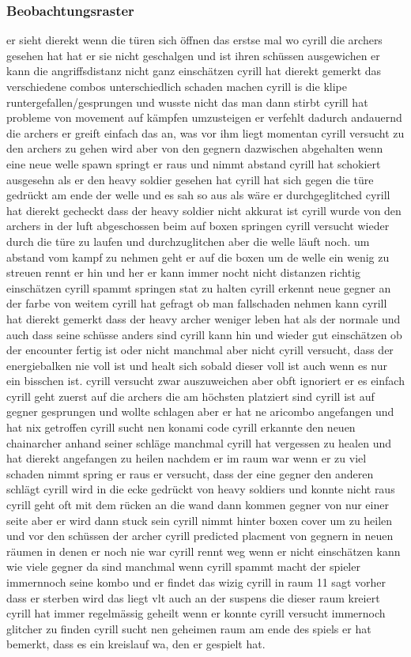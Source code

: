 \documentclass[../Main.tex]{subfiles}
\begin{document}
\subsubsection{Beobachtungsraster}
er sieht dierekt wenn die türen sich öffnen
das erstse mal wo cyrill die archers gesehen hat hat er sie nicht geschalgen und ist ihren schüssen ausgewichen
er kann die angriffsdistanz nicht ganz einschätzen
cyrill hat dierekt gemerkt das verschiedene combos unterschiedlich schaden machen
cyrill is die klipe runtergefallen/gesprungen und wusste nicht das man dann stirbt
cyrill hat probleme von movement auf kämpfen umzusteigen er verfehlt dadurch andauernd die archers
er greift einfach das an, was vor ihm liegt momentan
cyrill versucht zu den archers zu gehen wird aber von den gegnern dazwischen abgehalten
wenn eine neue welle spawn springt er raus und nimmt abstand
cyrill hat schokiert ausgesehn als er den heavy soldier gesehen hat
cyrill hat sich gegen die türe gedrückt am ende der welle und es sah so aus als wäre er durchgeglitched
cyrill hat dierekt gecheckt dass der heavy soldier nicht akkurat ist
cyrill wurde von den archers in der luft abgeschossen beim auf boxen springen
cyrill versucht wieder durch die türe zu laufen und durchzuglitchen aber die welle läuft noch.
um abstand vom kampf zu nehmen geht er auf die boxen
um de welle ein wenig zu streuen rennt er hin und her
er kann immer nocht nicht distanzen richtig einschätzen
cyrill spammt springen stat zu halten
cyrill erkennt neue gegner an der farbe von weitem
cyrill hat gefragt ob man fallschaden nehmen kann
cyrill hat dierekt gemerkt dass der heavy archer weniger leben hat als der normale und auch dass seine schüsse anders sind
cyrill kann hin und wieder gut einschätzen ob der encounter fertig ist oder nicht manchmal aber nicht
cyrill versucht, dass der energiebalken nie voll ist und healt sich sobald dieser voll ist auch wenn es nur ein bisschen ist.
cyrill versucht zwar auszuweichen aber obft ignoriert er es einfach
cyrill geht zuerst auf die archers die am höchsten platziert sind
cyrill ist auf gegner gesprungen und wollte schlagen aber er hat ne aricombo angefangen und hat nix getroffen
cyrill sucht nen konami code
cyrill erkannte den neuen chainarcher anhand seiner schläge
manchmal cyrill hat vergessen zu healen und hat dierekt angefangen zu heilen nachdem er im raum war
wenn er zu viel schaden nimmt spring er raus
er versucht, dass der eine gegner den anderen schlägt
cyrill wird in die ecke gedrückt von heavy soldiers und konnte nicht raus
cyrill geht oft mit dem rücken an die wand dann kommen gegner von nur einer seite aber er wird dann stuck sein
cyrill nimmt hinter boxen cover um zu heilen und vor den schüssen der archer
cyrill predicted placment von gegnern in neuen räumen in denen er noch nie war
cyrill rennt weg wenn er nicht einschätzen kann wie viele gegner da sind
manchmal wenn cyrill spammt macht der spieler immernnoch seine kombo und er findet das wizig
cyrill in raum 11 sagt vorher dass er sterben wird das liegt vlt auch an der suspens die dieser raum kreiert
cyrill hat immer regelmässig geheilt wenn er konnte
cyrill versucht immernoch glitcher zu finden
cyrill sucht nen geheimen raum am ende des spiels
er hat bemerkt, dass es ein kreislauf wa, den er gespielt hat.
\end{document}
